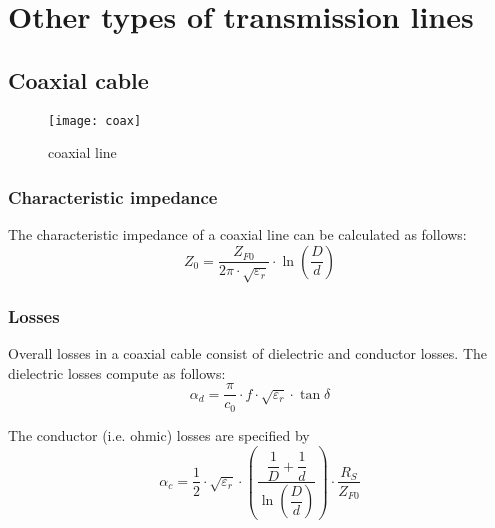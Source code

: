 %
%
%
%

\chapter{Other types of transmission lines}

\section{Coaxial cable}

\begin{figure}[ht]
\begin{center}
\texttt{[image: coax]}
\end{center}
\caption{coaxial line}
\label{fig:coax}
\end{figure}
\FloatBarrier

\subsection{Characteristic impedance}

The characteristic impedance of a coaxial line can be calculated as follows:
\begin{equation}
Z_0 = \dfrac{Z_{F0}}{2\pi\cdot\sqrt{\varepsilon_r}}\cdot\ln{\left(\dfrac{D}{d}\right)}
\end{equation}

\subsection{Losses}

Overall losses in a coaxial cable consist of dielectric and conductor
losses.  The dielectric losses compute as follows:
\begin{equation}
\alpha_d = \dfrac{\pi}{c_0}\cdot f\cdot \sqrt{\varepsilon_r} \cdot \tan{\delta}
\end{equation}

The conductor (i.e. ohmic) losses are specified by
\begin{equation}
\alpha_c = \dfrac{1}{2}\cdot \sqrt{\varepsilon_r} \cdot\left(\dfrac{\dfrac{1}{D} + \dfrac{1}{d}}{\ln{\left(\dfrac{D}{d}\right)}}\right)\cdot\dfrac{R_S}{Z_{F0}}
\end{equation}

